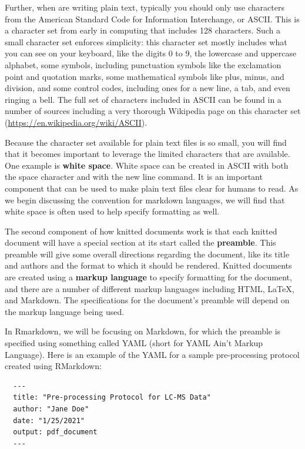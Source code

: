 \documentclass[]{tufte-book}
\begin{document}
Further, when are writing plain text, typically you should only use characters
from the American Standard Code for Information Interchange, or ASCII. This is a
character set from early in computing that includes 128 characters. Such a small
character set enforces simplicity: this character set mostly includes what you
can see on your keyboard, like the digits 0 to 9, the lowercase and uppercase
alphabet, some symbols, including punctuation symbols like the exclamation point
and quotation marks, some mathematical symbols like plus, minus, and division,
and some control codes, including ones for a new line, a tab, and even ringing a
bell. The full set of characters included in ASCII can be found in a number of
sources including a very thorough Wikipedia page on this character set (\url{https://en.wikipedia.org/wiki/ASCII}).

Because the character set available for plain text files is so small, you will
find that it becomes important to leverage the limited characters that are
available. One example is \textbf{white space}. White space can be created in ASCII
with both the space character and with the new line command. It is an important
component that can be used to make plain text files clear for humans to read. As
we begin discussing the convention for markdown languages, we will find that
white space is often used to help specify formatting as well.

The second component of how knitted documents work is that each knitted document
will have a special section at its start called the \textbf{preamble}. This preamble
will give some overall directions regarding the document, like its title and
authors and the format to which it should be rendered. Knitted documents are
created using a \textbf{markup language} to specify formatting for the document, and
there are a number of different markup languages including HTML, LaTeX, and
Markdown. The specifications for the document's preamble will depend on the
markup language being used.

In Rmarkdown, we will be focusing on Markdown, for which the preamble is
specified using something called YAML (short for YAML Ain't Markup Language).
Here is an example of the YAML for a sample pre-processing protocol created
using RMarkdown:

\begin{verbatim}
  ---
  title: "Pre-processing Protocol for LC-MS Data"
  author: "Jane Doe"
  date: "1/25/2021"
  output: pdf_document
  ---
\end{verbatim}
\end{document}
